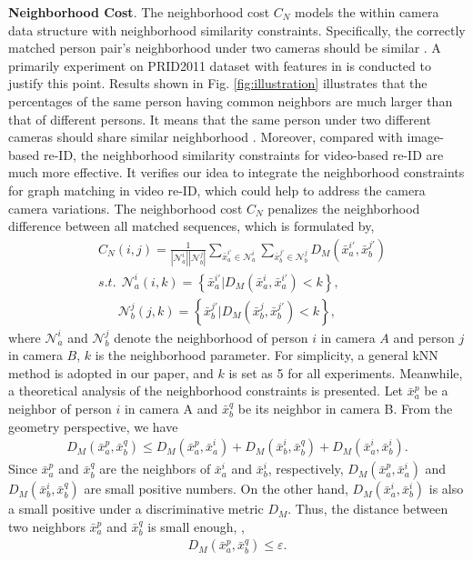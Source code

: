 \documentclass[10pt,twocolumn,letterpaper]{article}
\begin{document}
\textbf{Neighborhood Cost}. The neighborhood cost $C_{N}$ models the within camera data structure with neighborhood similarity constraints. Specifically, the correctly matched person pair's neighborhood under two cameras should be similar \cite{mmm15,mm15rank}. A primarily experiment on PRID2011 dataset with features in \cite{iccv15des} is conducted to justify this point. Results shown in Fig. \ref{fig:illustration} illustrates that the percentages of the same person having common neighbors are much larger than that of different persons. It means that the same person under two different cameras should share similar neighborhood \cite{tmm16cross}. Moreover, compared with image-based re-ID, the neighborhood similarity constraints for video-based re-ID are much more effective. It verifies our idea to integrate the neighborhood constraints for graph matching in video re-ID, which could help to address the camera camera variations. The neighborhood cost $C_N$ penalizes the neighborhood difference between all matched sequences, which is formulated by,
\begin{equation}\label{eq:Nieghcost}
\begin{split}
& C_{N}(i,j) =  \frac{1}{|\mathcal{N}^i_{a}||\mathcal{N}^j_{b}|} \sum_{\bar{x}_a^{i'} \in \mathcal{N}^i_{a}} \sum_{{\bar{x}_b^{j'}} \in \mathcal{N}^j_{b}}{D_M( \bar{x}_a^{i'}, \bar{x}_b^{j'})}\\
& s.t. ~~\mathcal{N}^i_{a}(i,k) = \left\{ \bar{x}_a^{i'} | D_M(\bar{x}_a^i, \bar{x}_a^{i'}) < k \right\}, \\
& ~~~~~~~\mathcal{N}^j_{b}(j,k) = \left\{ \bar{x}_b^{j'} | D_M(\bar{x}_b^j, \bar{x}_b^{j'}) < k \right\},
\end{split}
\end{equation}
where $\mathcal{N}^i_{a}$ and $\mathcal{N}^j_{b}$ denote the neighborhood of person $i$ in camera $A$ and person $j$ in camera $B$, $k$ is the neighborhood parameter. For simplicity, a general kNN method is adopted in our paper, and $k$ is set as 5 for all experiments. Meanwhile, a theoretical analysis of the neighborhood constraints is presented. Let $\bar{x}_a^p$ be a neighbor of person $i$ in camera A and $\bar{x}_b^q$ be its neighbor in camera B. From the geometry perspective, we have
\begin{equation}\label{eq:setNpres}
\begin{split}
D_M(\bar{x}_a^p,\bar{x}_b^q)\leq D_M(\bar{x}_a^p,\bar{x}_a^i) + D_M(\bar{x}_b^i,\bar{x}_b^q) +D_M(\bar{x}_a^i,\bar{x}_b^i).
\end{split}
\end{equation}
Since $\bar{x}_a^p$ and $\bar{x}_b^q$ are the neighbors of $\bar{x}_a^i$ and $\bar{x}_b^i$, respectively, $D_M(\bar{x}_a^p,\bar{x}_a^i)$ and $D_M(\bar{x}_b^i,\bar{x}_b^q) $ are small positive numbers. On the other hand, $D_M(\bar{x}_a^i,\bar{x}_b^i)$ is also a small positive under a discriminative metric $D_M$. Thus, the distance between two neighbors $\bar{x}_a^p$ and $\bar{x}_b^q$ is small enough, \ie,
\begin{equation}\label{eq:assum}
\begin{split}
D_M(\bar{x}_a^p,\bar{x}_b^q)\leq\varepsilon.
\end{split}
\end{equation}
\end{document}

